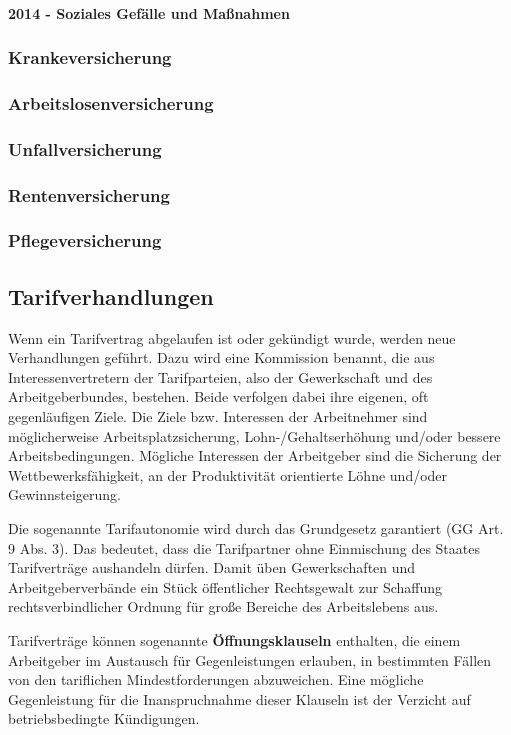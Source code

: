 \paragraph{2014 - Soziales Gefälle und Maßnahmen}

\subsubsection{Krankeversicherung}
\subsubsection{Arbeitslosenversicherung}
\subsubsection{Unfallversicherung}
\subsubsection{Rentenversicherung}
\subsubsection{Pflegeversicherung}

\subsection{Tarifverhandlungen}

Wenn ein Tarifvertrag abgelaufen ist oder gekündigt wurde, werden neue Verhandlungen geführt. Dazu wird eine Kommission benannt, die aus Interessenvertretern der Tarifparteien, also der Gewerkschaft und des Arbeitgeberbundes, bestehen. Beide verfolgen dabei ihre eigenen, oft gegenläufigen Ziele. Die Ziele bzw. Interessen der Arbeitnehmer sind möglicherweise Arbeitsplatzsicherung, Lohn-/Gehaltserhöhung und/oder bessere Arbeitsbedingungen. Mögliche Interessen der Arbeitgeber sind die Sicherung der Wettbewerksfähigkeit, an der Produktivität orientierte Löhne und/oder Gewinnsteigerung. 

Die sogenannte Tarifautonomie wird durch das Grundgesetz garantiert (GG Art. 9 Abs. 3). Das bedeutet, dass die Tarifpartner ohne Einmischung des Staates Tarifverträge aushandeln dürfen. Damit üben Gewerkschaften und Arbeitgeberverbände ein Stück öffentlicher Rechtsgewalt zur Schaffung rechtsverbindlicher Ordnung für große Bereiche des Arbeitslebens aus.

Tarifverträge können sogenannte {\bf Öffnungsklauseln} enthalten, die einem Arbeitgeber im Austausch für Gegenleistungen erlauben, in bestimmten Fällen von den tariflichen Mindestforderungen abzuweichen. Eine mögliche Gegenleistung für die Inanspruchnahme dieser Klauseln ist der Verzicht auf betriebsbedingte Kündigungen.

